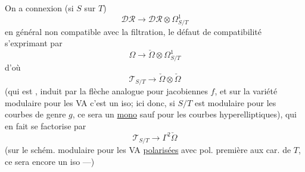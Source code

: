 On a connexion  (si $S$ sur $T$)
\[
\mathcal{DR}\longrightarrow\mathcal{DR}\otimes\Omega^1_{S/T}
\]
en général non compatible avec la filtration, le défaut de compatibilité s'exprimant par
\[
\Omega\longrightarrow\check\Omega\otimes\Omega^1_{S/T}
\]
d'où
\[
\mathcal{T}_{S/T}\longrightarrow\check\Omega\otimes\check\Omega
\]
(qui est , induit par la flèche analogue pour jacobiennes $f$, et sur la variété modulaire pour les VA  c'est un iso; ici donc,  si $S/T$ est modulaire pour les courbes de genre $g$, ce sera un \uline{mono} sauf pour les courbes hyperelliptiques), qui en fait se factorise par
\[
\mathcal{T}_{S/T}\longrightarrow\Gamma^2\check\Omega
\]
(sur le schém. modulaire pour les VA \uline{polarisées} avec pol.  première aux car. de $T$, ce sera encore un iso ---)

